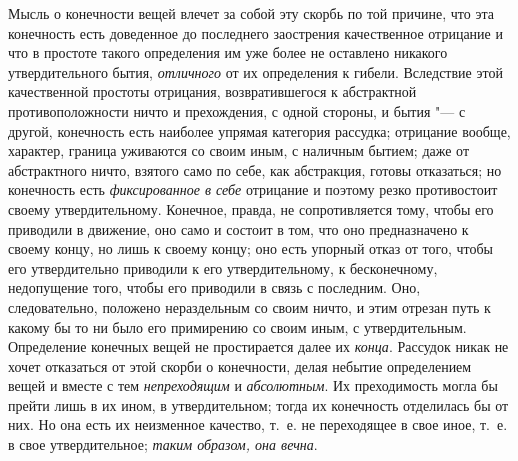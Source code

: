 Мысль о конечности вещей влечет за собой эту скорбь по той причине, что эта
конечность есть доведенное до последнего заострения качественное отрицание
и что в простоте такого определения им уже более не оставлено никакого
утвердительного бытия, {\em отличного} от их
определения к гибели. Вследствие этой качественной простоты отрицания,
возвратившегося к абстрактной противоположности ничто и прехождения, с
одной стороны, и бытия "--- с другой, конечность есть наиболее упрямая
категория рассудка; отрицание вообще, характер, граница уживаются со своим
иным, с наличным бытием; даже от абстрактного ничто, взятого само по
себе, как абстракция, готовы отказаться; но конечность есть
{\em фиксированное в себе} отрицание и поэтому резко
противостоит своему утвердительному. Конечное, правда, не сопротивляется
тому, чтобы его приводили в движение, оно само и состоит в том, что оно
предназначено к своему концу, но лишь к своему концу; оно есть упорный
отказ от того, чтобы его утвердительно приводили к его утвердительному, к
бесконечному, недопущение того, чтобы его приводили в связь с последним.
Оно, следовательно, положено нераздельным со своим ничто, и этим отрезан
путь к какому бы то ни было его примирению со своим иным, с
утвердительным. Определение конечных вещей не простирается далее их
{\em конца}. Рассудок никак не хочет отказаться от этой
скорби о конечности, делая небытие определением вещей и вместе с тем
{\em непреходящим} и
{\em абсолютным}. Их преходимость могла бы прейти лишь
в их ином, в утвердительном; тогда их конечность отделилась бы от них. Но
она есть их неизменное качество, т.~е. не переходящее в свое иное, т.~е.
в свое утвердительное; {\em таким образом, она вечна}.

